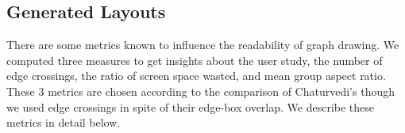 \documentclass{llncs}
\begin{document}
\subsection{Generated Layouts}

There are some metrics known to influence the readability of graph drawing. We computed three measures to get insights about the user study, the number of edge crossings, the ratio of screen space wasted, and mean group aspect ratio.
These 3 metrics are chosen according to the comparison of Chaturvedi's \cite{chatu} though we used edge crossings in spite of their edge-box overlap.
We describe these metrics in detail below.
\end{document}
